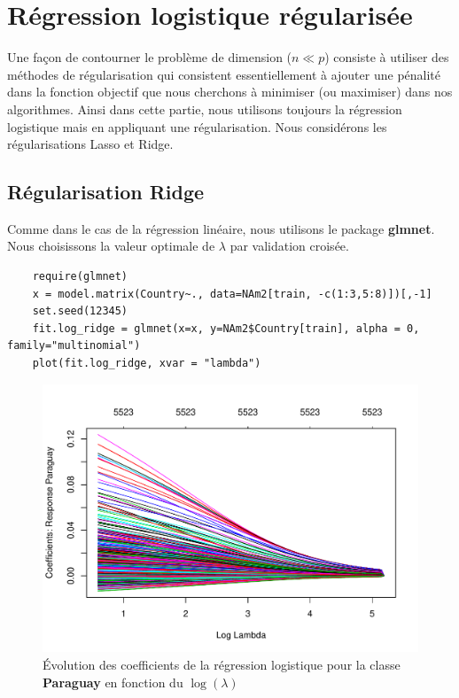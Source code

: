 \documentclass[12pt,a4paper]{article}
\begin{document}
\section{Régression logistique régularisée}
Une façon de contourner le problème de dimension ($n\ll p$) consiste à utiliser des méthodes de régularisation qui consistent essentiellement à ajouter une pénalité dans la fonction objectif que nous cherchons à minimiser (ou maximiser) dans nos algorithmes. Ainsi dans cette partie, nous utilisons toujours la régression logistique mais en appliquant une régularisation. Nous considérons les régularisations Lasso et Ridge.
\subsection{Régularisation Ridge}
Comme dans le cas de la régression linéaire, nous utilisons le package \textbf{glmnet}. Nous choisissons la valeur optimale de $\lambda$ par validation croisée.
\begin{lstlisting}
	require(glmnet)
	x = model.matrix(Country~., data=NAm2[train, -c(1:3,5:8)])[,-1]
	set.seed(12345)
	fit.log_ridge = glmnet(x=x, y=NAm2$Country[train], alpha = 0, family="multinomial")
	plot(fit.log_ridge, xvar = "lambda")
\end{lstlisting}
\begin{figure}[h!]
	\begin{center}
		\includegraphics[scale=0.5]{figures/coef_ridge.pdf}
		\caption{Évolution des coefficients de la régression logistique pour la classe \textbf{Paraguay} en fonction du $\log(\lambda)$}
		\label{fig:r_lambda}
	\end{center}
\end{figure}
\end{document}
